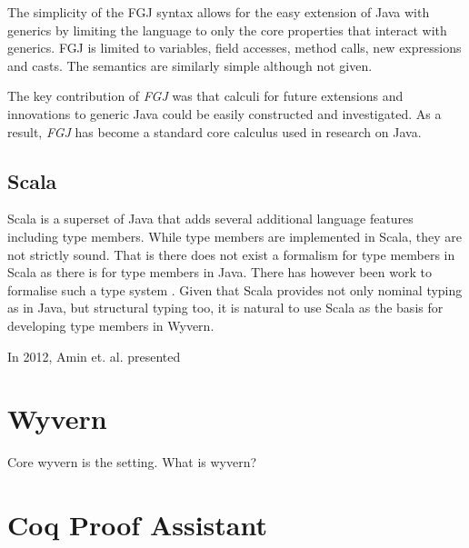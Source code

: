 \documentclass[11pt
              , a4paper
              , twoside
              , openright
              ]{report}
\numberwithin{case}{theorem}
\numberwithin{subcase}{case}
\begin{document}
The simplicity of the FGJ syntax allows for the easy extension of Java with generics \cite{Potanin:2006:GOG:1167473.1167500, Zibin:2010:OIG:1932682.1869509} by limiting the language to only the core properties that interact with generics. FGJ is limited to variables, field accesses, method calls, new expressions and casts. The semantics are similarly simple although not given. 

The key contribution of \emph{FGJ} was that calculi for future extensions and innovations to generic Java could be easily constructed and investigated. As a result, \emph{FGJ} has become a standard core calculus used in research on Java.

\subsection{Scala}
Scala \cite{scaladocs2016} is a superset of Java that adds several additional language features including type members. While type members are implemented in Scala, they are not strictly sound. That is there does not exist a formalism for type members in Scala as there is for type members in Java. There has however been work to formalise such a type system \cite{Amin:2014:FPT:2660193.2660216,amin:fool:2012}. Given that Scala provides not only nominal typing as in Java, but structural typing too, it is natural to use Scala as the basis for developing type members in Wyvern.

In 2012, Amin et. al. \cite{amin:fool:2012} presented 


\section{Wyvern}\label{s:wyvern}
Core wyvern is the setting. What is wyvern?

\section{Coq Proof Assistant}
\end{document}
